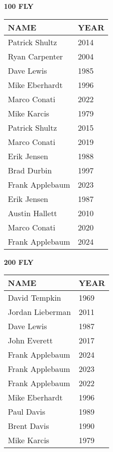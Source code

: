 \begin{table}[H]
\centering
\begin{minipage}[t]{0.48\textwidth}
\centering
\textbf{100 FLY}\\[0.1cm]
\begin{tabular}{@{}p{2.8cm}p{1.2cm}@{}}
\hline
    \textbf{NAME} & \textbf{YEAR} \\
\hline
    Patrick Shultz & 2014 \\
    Ryan Carpenter & 2004 \\
    Dave Lewis & 1985 \\
    Mike Eberhardt & 1996 \\
    Marco Conati & 2022 \\
    Mike Karcis & 1979 \\
    Patrick Shultz & 2015 \\
    Marco Conati & 2019 \\
    Erik Jensen & 1988 \\
    Brad Durbin & 1997 \\
    Frank Applebaum & 2023 \\
    Erik Jensen & 1987 \\
    Austin Hallett & 2010 \\
    Marco Conati & 2020 \\
    Frank Applebaum & 2024 \\
\hline
\end{tabular}
\end{minipage}\hfill
\begin{minipage}[t]{0.48\textwidth}
\centering
\textbf{200 FLY}\\[0.1cm]
\begin{tabular}{@{}p{2.8cm}p{1.2cm}@{}}
\hline
    \textbf{NAME} & \textbf{YEAR} \\
\hline
    David Tempkin & 1969 \\
    Jordan Lieberman & 2011 \\
    Dave Lewis & 1987 \\
    John Everett & 2017 \\
    Frank Applebaum & 2024 \\
    Frank Applebaum & 2023 \\
    Frank Applebaum & 2022 \\
    Mike Eberhardt & 1996 \\
    Paul Davis & 1989 \\
    Brent Davis & 1990 \\
    Mike Karcis & 1979 \\
\hline
\end{tabular}
\end{minipage}
\end{table}

